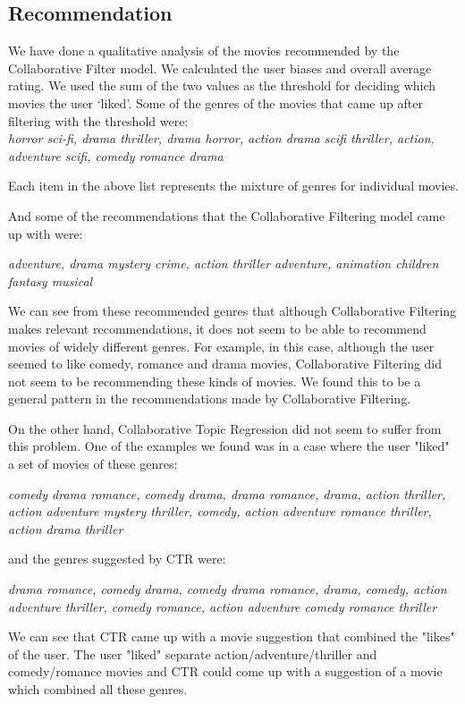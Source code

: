 \documentclass{article} %
\begin{document}
\subsection{Recommendation}

We have done a qualitative analysis of the movies recommended by the 
Collaborative Filter model. We calculated the user biases and overall average 
rating. We used the sum of the two values as the threshold 
for deciding which movies the user `liked'. Some of the genres of the movies that came up after filtering with the threshold were: \\
\textit{horror sci-fi, drama thriller, drama horror, action drama scifi thriller, action, adventure scifi, comedy romance drama}

Each item in the above list represents the mixture of genres for individual movies. 

And some of the recommendations that the Collaborative Filtering model came up with were:

\textit{adventure, drama mystery crime, action thriller adventure, animation children fantasy musical}

We can see from these recommended genres that although Collaborative Filtering makes relevant recommendations, 
it does not seem to be able to recommend movies of widely different genres. For example, in this case, although the user 
seemed to like comedy, romance and drama movies, Collaborative Filtering did not seem to be recommending these kinds of movies.
We found this to be a general pattern in the recommendations made by Collaborative Filtering.

On the other hand, Collaborative Topic Regression did not seem to suffer from this problem. One of the examples we found was in 
a case where the user "liked" a set of movies of these genres:

\textit{comedy drama romance, comedy drama, drama romance, drama, action thriller, action adventure mystery thriller, comedy, action adventure romance thriller, action drama thriller}

and the genres suggested by CTR were:

\textit{drama romance, comedy drama, comedy drama romance, drama, comedy, action adventure thriller, comedy romance, action adventure comedy romance thriller}

We can see that CTR came up with a movie suggestion that combined the "likes" of the user.
The user "liked" separate action/adventure/thriller and comedy/romance movies and CTR could come up with a suggestion of a movie which combined all these genres.
\end{document}
